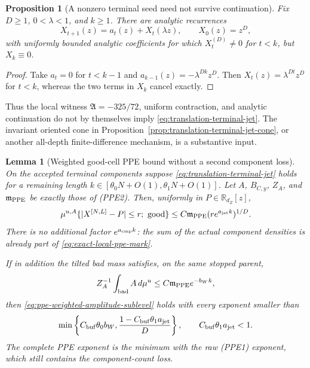\documentclass[11pt]{article}
\newtheorem{proposition}[theorem]{Proposition}
\newtheorem{lemma}[theorem]{Lemma}
\begin{document}
\begin{proposition}[A nonzero terminal seed need not survive continuation]
\label{prop:terminal-seed-cancellation}
Fix $D\ge1$, $0<\lambda<1$, and $k\ge1$.  There are analytic recurrences
\[
 X_{t+1}(z)=a_t(z)+X_t(\lambda z),\qquad X_0(z)=z^D,
\]
with uniformly bounded analytic coefficients for which
$X_t^{(D)}\ne0$ for $t<k$, but $X_k\equiv0$.
\end{proposition}

\begin{proof}
Take $a_t=0$ for $t<k-1$ and
$a_{k-1}(z)=-\lambda^{Dk}z^D$.  Then
$X_t(z)=\lambda^{Dt}z^D$ for $t<k$, whereas the two terms in $X_k$
cancel exactly.
\end{proof}

Thus the local witness $\mathfrak A=-325/72$, uniform contraction, and
analytic continuation do not by themselves imply
\eqref{eq:translation-terminal-jet}.  The invariant oriented cone in
Proposition~\ref{prop:translation-terminal-jet-cone}, or another
all-depth finite-difference mechanism, is a substantive input.

\begin{lemma}[Weighted good-cell PPE bound without a second component loss]
\label{lem:translation-weighted-good-cell-PPE}
On the accepted terminal components suppose
\eqref{eq:translation-terminal-jet} holds for a remaining length
$k\in[\theta_0N+O(1),\theta_1N+O(1)]$.  Let $A$, $B_{C,y}$,
$Z_A$, and $\mathfrak m_{\rm PPE}$ be exactly those of
\textup{(PPE2)}.  Then, uniformly in
$P\in\mathbb R_{d_Z}[z]$,
\begin{equation}
\label{eq:translation-weighted-good-cell-bound}
 \mu^{u,A}\{|X^{[N,L]}-P|\le r;\ {\rm good}\}
 \le C\mathfrak m_{\rm PPE}
       (re^{a_{\rm jet}k})^{1/D}.
\end{equation}
There is no additional factor $e^{a_{\rm cmp}k}$: the sum of the actual
component densities is already part of
\eqref{eq:exact-local-ppe-mark}.

If in addition the tilted bad mass satisfies, on the same stopped parent,
\begin{equation}
\label{eq:translation-weighted-bad-mass}
 Z_A^{-1}\int_{\rm bad}A\,d\mu^u
 \le C\mathfrak m_{\rm PPE}e^{-b_Wk},
\end{equation}
then \eqref{eq:ppe-weighted-amplitude-sublevel} holds with every exponent
smaller than
\begin{equation}
\label{eq:translation-weighted-ppe-cone-exponent}
 \min\left\{C_{\rm buf}\theta_0b_W,
 \frac{1-C_{\rm buf}\theta_1a_{\rm jet}}D\right\},
 \qquad C_{\rm buf}\theta_1a_{\rm jet}<1.
\end{equation}
The complete PPE exponent is the minimum with the raw
\textup{(PPE1)} exponent, which still contains the component-count loss.
\end{lemma}
\end{document}
